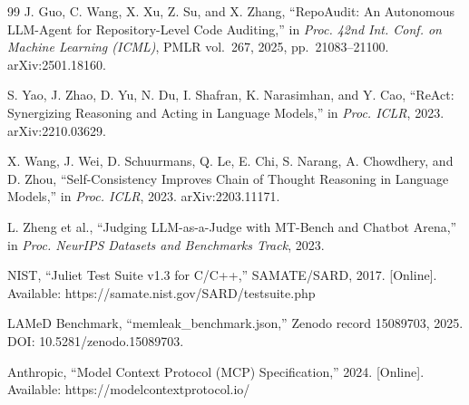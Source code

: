 \documentclass[a4paper]{llncs}
\begin{document}
\begin{thebibliography}{99}
 J. Guo, C. Wang, X. Xu, Z. Su, and X. Zhang, ``RepoAudit: An Autonomous LLM-Agent for Repository-Level Code Auditing,'' in \textit{Proc. 42nd Int. Conf. on Machine Learning (ICML)}, PMLR vol.~267, 2025, pp.~21083--21100. arXiv:2501.18160.

 S. Yao, J. Zhao, D. Yu, N. Du, I. Shafran, K. Narasimhan, and Y. Cao, ``ReAct: Synergizing Reasoning and Acting in Language Models,'' in \textit{Proc. ICLR}, 2023. arXiv:2210.03629.

 X. Wang, J. Wei, D. Schuurmans, Q. Le, E. Chi, S. Narang, A. Chowdhery, and D. Zhou, ``Self-Consistency Improves Chain of Thought Reasoning in Language Models,'' in \textit{Proc. ICLR}, 2023. arXiv:2203.11171.

 L. Zheng et al., ``Judging LLM-as-a-Judge with MT-Bench and Chatbot Arena,'' in \textit{Proc. NeurIPS Datasets and Benchmarks Track}, 2023.

 NIST, ``Juliet Test Suite v1.3 for C/C++,'' SAMATE/SARD, 2017. [Online]. Available: https://samate.nist.gov/SARD/testsuite.php

 LAMeD Benchmark, ``memleak\_benchmark.json,'' Zenodo record 15089703, 2025. DOI: 10.5281/zenodo.15089703.

 Anthropic, ``Model Context Protocol (MCP) Specification,'' 2024. [Online]. Available: https://modelcontextprotocol.io/

\end{thebibliography}
\end{document}
